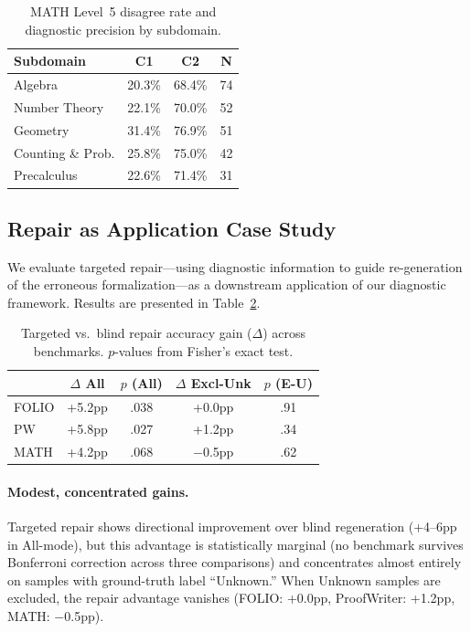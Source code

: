 \documentclass[11pt,a4paper]{article}
\begin{document}
\begin{table}[t]
\centering
\small
\caption{MATH Level~5 disagree rate and diagnostic precision by subdomain.}
\label{tab:math-subdomain}
\begin{tabular}{lccc}
\toprule
\textbf{Subdomain} & \textbf{C1} & \textbf{C2} & \textbf{N} \\
\midrule
Algebra & 20.3\% & 68.4\% & 74 \\
Number Theory & 22.1\% & 70.0\% & 52 \\
Geometry & 31.4\% & 76.9\% & 51 \\
Counting \& Prob. & 25.8\% & 75.0\% & 42 \\
Precalculus & 22.6\% & 71.4\% & 31 \\
\bottomrule
\end{tabular}
\end{table}

\subsection{Repair as Application Case Study}
\label{sec:repair}

We evaluate targeted repair---using diagnostic information to guide re-generation of the erroneous formalization---as a downstream application of our diagnostic framework. Results are presented in Table~\ref{tab:repair}.

\begin{table}[t]
\centering
\small
\caption{Targeted vs.\ blind repair accuracy gain ($\Delta$) across benchmarks. $p$-values from Fisher's exact test.}
\label{tab:repair}
\begin{tabular}{lcccc}
\toprule
 & \textbf{$\Delta$ All} & \textbf{$p$ (All)} & \textbf{$\Delta$ Excl-Unk} & \textbf{$p$ (E-U)} \\
\midrule
FOLIO & +5.2pp & .038 & +0.0pp & .91 \\
PW & +5.8pp & .027 & +1.2pp & .34 \\
MATH & +4.2pp & .068 & $-$0.5pp & .62 \\
\bottomrule
\end{tabular}
\end{table}

\paragraph{Modest, concentrated gains.} Targeted repair shows directional improvement over blind regeneration (+4--6pp in All-mode), but this advantage is statistically marginal (no benchmark survives Bonferroni correction across three comparisons) and concentrates almost entirely on samples with ground-truth label ``Unknown.'' When Unknown samples are excluded, the repair advantage vanishes (FOLIO: +0.0pp, ProofWriter: +1.2pp, MATH: $-$0.5pp).
\end{document}
